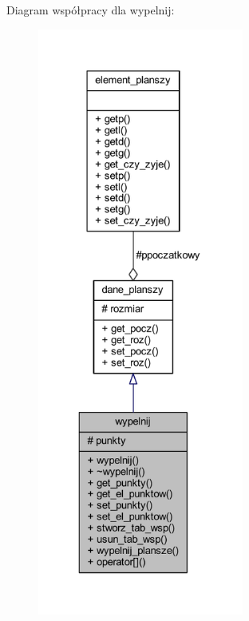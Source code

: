 Diagram współpracy dla wypelnij\+:
\nopagebreak
\begin{figure}[H]
\begin{center}
\leavevmode
\includegraphics[height=550pt]{classwypelnij__coll__graph}
\end{center}
\end{figure}
